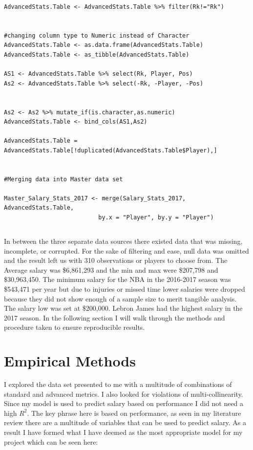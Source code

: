 \documentclass[12pt,english]{article}
\begin{document}
\begin{singlespace}
\begin{lstlisting}
AdvancedStats.Table <- AdvancedStats.Table %>% filter(Rk!="Rk")


#changing column type to Numeric instead of Character
AdvancedStats.Table <- as.data.frame(AdvancedStats.Table)
AdvancedStats.Table <- as_tibble(AdvancedStats.Table)

AS1 <- AdvancedStats.Table %>% select(Rk, Player, Pos)
As2 <- AdvancedStats.Table %>% select(-Rk, -Player, -Pos)


As2 <- As2 %>% mutate_if(is.character,as.numeric)
AdvancedStats.Table <- bind_cols(AS1,As2)

AdvancedStats.Table = AdvancedStats.Table[!duplicated(AdvancedStats.Table$Player),]


#Merging data into Master data set

Master_Salary_Stats_2017 <- merge(Salary_Stats_2017, AdvancedStats.Table,
                           by.x = "Player", by.y = "Player")
\end{lstlisting}
\end{singlespace}

\subsection{}
In between the three separate data sources there existed data that was missing, incomplete, or corrupted. For the sake of filtering and ease, null data was omitted and the result left us with 310 observations or players to choose from. The Average salary was \$6,861,293 and the min and max were \$207,798 and \$30,963,450. The minimum salary for the NBA in the 2016-2017 season was \$543,471 per year but due to injuries or missed time lower salaries were dropped because they did not show enough of a sample size to merit tangible analysis. The salary low was set at \$200,000. Lebron James had the highest salary in the 2017 season. In the following section I will walk through the methods and procedure taken to ensure reproducible results.
\newpage

\section{Empirical Methods}\label{sec:methods}
I explored the data set presented to me with a multitude of combinations of standard and advanced metrics. I also looked for violations of multi-collinearity. Since my model is used to predict salary based on performance I did not need a high $R^{2}$. The key phrase here is based on performance, as seen in my literature review there are a multitude of variables that can be used to predict salary. As a result I have formed what I have deemed as the most appropriate model for my project which can be seen here:
\end{document}
